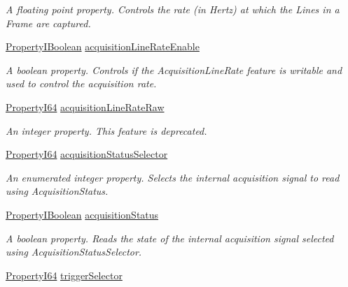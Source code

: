 \begin{DoxyCompactItemize}
\begin{DoxyCompactList}\small\item\em A floating point property. Controls the rate (in Hertz) at which the Lines in a Frame are captured. \end{DoxyCompactList}\item 
\hyperlink{group___common_interface_ga44f9437e24b21b6c93da9039ec6786aa}{Property\+I\+Boolean} \hyperlink{classmv_i_m_p_a_c_t_1_1acquire_1_1_gen_i_cam_1_1_acquisition_control_a474bf5cf15c9b733b1c1e73cc520885a}{acquisition\+Line\+Rate\+Enable}
\begin{DoxyCompactList}\small\item\em A boolean property. Controls if the Acquisition\+Line\+Rate feature is writable and used to control the acquisition rate. \end{DoxyCompactList}\item 
\hyperlink{group___common_interface_ga81749b2696755513663492664a18a893}{Property\+I64} \hyperlink{classmv_i_m_p_a_c_t_1_1acquire_1_1_gen_i_cam_1_1_acquisition_control_abc83f72810dfec15d0ef47c258ca8a53}{acquisition\+Line\+Rate\+Raw}
\begin{DoxyCompactList}\small\item\em An integer property. This feature is deprecated. \end{DoxyCompactList}\item 
\hyperlink{group___common_interface_ga81749b2696755513663492664a18a893}{Property\+I64} \hyperlink{classmv_i_m_p_a_c_t_1_1acquire_1_1_gen_i_cam_1_1_acquisition_control_aadb492cee15f403d411a927ccdc6195f}{acquisition\+Status\+Selector}
\begin{DoxyCompactList}\small\item\em An enumerated integer property. Selects the internal acquisition signal to read using Acquisition\+Status. \end{DoxyCompactList}\item 
\hyperlink{group___common_interface_ga44f9437e24b21b6c93da9039ec6786aa}{Property\+I\+Boolean} \hyperlink{classmv_i_m_p_a_c_t_1_1acquire_1_1_gen_i_cam_1_1_acquisition_control_a44d19fa3bc046ac368cf2a6b5a3d2205}{acquisition\+Status}
\begin{DoxyCompactList}\small\item\em A boolean property. Reads the state of the internal acquisition signal selected using Acquisition\+Status\+Selector. \end{DoxyCompactList}\item 
\hyperlink{group___common_interface_ga81749b2696755513663492664a18a893}{Property\+I64} \hyperlink{classmv_i_m_p_a_c_t_1_1acquire_1_1_gen_i_cam_1_1_acquisition_control_a38e4b4d2d7da4b24d3686be94cc0a886}{trigger\+Selector}

\end{DoxyCompactItemize}
